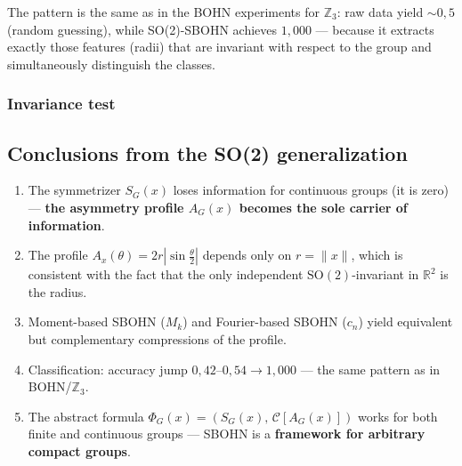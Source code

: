 \documentclass[11pt,a4paper]{report}
\begin{document}
\noindent{}


The pattern is the same as in the BOHN experiments for $\mathbb{Z}_3$: raw data yield ${\sim}0{,}5$ (random guessing), while SO(2)-SBOHN achieves $1{,}000$ --- because it extracts exactly those features (radii) that are invariant with respect to the group and simultaneously distinguish the classes.

\subsubsection{Invariance test}

\noindent{}


\subsection{Conclusions from the SO(2) generalization}

\begin{enumerate}
  \item The symmetrizer $S_G(x)$ loses information for continuous groups (it is zero) --- \textbf{the asymmetry profile $A_G(x)$ becomes the sole carrier of information}.
  \item The profile $A_x(\theta)=2r|\sin\frac{\theta}{2}|$ depends only on $r=\|x\|$, which is consistent with the fact that the only independent $\mathrm{SO}(2)$-invariant in $\mathbb{R}^2$ is the radius.
  \item Moment-based SBOHN ($M_k$) and Fourier-based SBOHN ($c_n$) yield equivalent but complementary compressions of the profile.
  \item Classification: accuracy jump $0{,}42$--$0{,}54 \to 1{,}000$ --- the same pattern as in BOHN/$\mathbb{Z}_3$.
  \item The abstract formula $\Phi_G(x)=(S_G(x),\,\mathcal{C}[A_G(x)])$ works for both finite and continuous groups --- SBOHN is a \textbf{framework for arbitrary compact groups}.
\end{enumerate}


\end{document}

